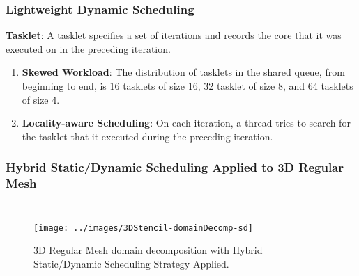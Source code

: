\begin{frame}[label=lightweightDynDefs]
\frametitle{Lightweight Dynamic Scheduling}
\textbf{Tasklet}: A tasklet specifies a set of iterations and records the core that it was executed on in the preceding iteration. 
\begin{enumerate}
\item \textbf{Skewed Workload}: The distribution of tasklets in the shared queue, from beginning to end, is 16 tasklets of size 16, 32 tasklet of size 8, and 64 tasklets of size 4. 
\item \textbf{Locality-aware Scheduling}: On each iteration, a thread tries to search for the tasklet that it executed during the preceding iteration. 
\end{enumerate}
\end{frame}

\begin{frame}[label=HybStatDynAppliedto3DMesh]
\frametitle{Hybrid Static/Dynamic Scheduling Applied to 3D Regular Mesh}
\begin{columns}

  \begin{figure}
    \label{fig:3DStencil-domainDecomp-sd}
    \begin{center}
      \texttt{[image: ../images/3DStencil-domainDecomp-sd]}
    \end{center}
    \caption{\label{fig:3DStencil-domainDecomp-hybrid} \small 3D Regular Mesh domain decomposition with Hybrid Static/Dynamic Scheduling Strategy Applied.}
  \end{figure}
\end{columns}
\end{frame}

